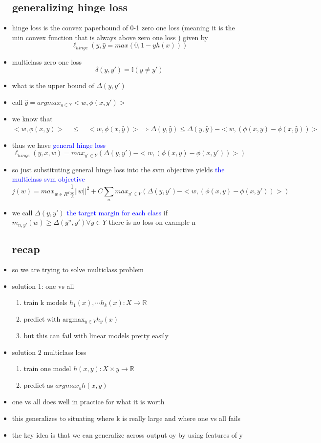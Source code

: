 \documentclass{article}
\begin{document}
\begin{itemize}
\subsection*{generalizing hinge loss}
\item hinge loss is the convex paperbound of 0-1 zero one loss (meaning it is the min convex function that is always above zero one loss ) given by $$\ell_{hinge}(y,\hat{y}=max(0,1-yh(x)))$$
\item multiclass zero one loss $$\delta(y,y')=\mathbb{I}(y\neq y')$$
\item what is the upper bound of $\Delta(y,y')$
\item call $\hat{y}=argmax_{y\in Y}<w,\phi(x,y')>$
\item we know that $<w,\phi(x,y)>\quad \leq\quad <w,\phi(x,\hat{y})>\Rightarrow \Delta(y,\hat{y})\leq \Delta(y,\hat{y})-<w,(\phi(x,y)-\phi(x,\hat{y}))>$ 
\item thus we have \textcolor{blue}{general hinge loss} $$\ell_{hinge}(y,x,w)=max_{y'\in Y}(\Delta(y,y')-<w, (\phi(x,y)- \phi(x,y'))>)$$
\item so just substituting general hinge loss into the svm objective yields \textcolor{blue}{the multiclass svm objective}$$j(w)=max_{w\in R^{d}}\frac{1}{2}||w||^{2}+C\sum_{n}max_{y'\in Y}(\Delta(y,y')-<w,(\phi(x,y)-\phi(x,y'))>)$$
\item we call $\Delta(y,y')$ \textcolor{blue}{the target margin for each class}  if $m_{n,y'}(w)\geq \Delta(y^n,y')\forall y\in Y$ there is no loss on example n 
\subsection*{recap}
\item so we are trying to solve multiclass problem
\item solution 1: one vs all 
\begin{enumerate}
    \item train k models $h_{1}(x),\cdots h_{k}(x):X\rightarrow \mathbb{R}$
    \item predict with argmax$_{y\in Y}h_{y}(x)$
    \item but this can fail with linear models pretty easily 
\end{enumerate}
\item solution 2 multiclass loss 
\begin{enumerate}
    \item train one model $h(x,y):X\times y\rightarrow \mathbb{R}$
    \item predict as $argmax_{y}h(x,y)$
\end{enumerate}
\item one vs all does well in practice for what it is worth 
\item this generalizes to situating  where k is really large and where one vs all fails
\item the key idea is that we can generalize across output oy by using features of y 

\end{itemize}
\end{document}
